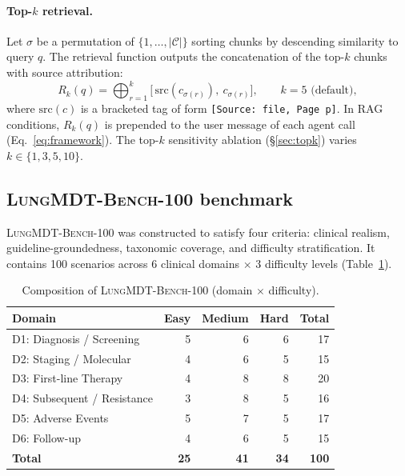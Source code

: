 \documentclass[final, 11pt, 3p]{elsarticle}
\newcommand{\BENCH}{\textsc{LungMDT-Bench-100}}
\begin{document}
\paragraph{Top-$k$ retrieval.} Let $\sigma$ be a permutation of
$\{1, \ldots, |\mathcal{C}|\}$ sorting chunks by descending similarity
to query $q$. The retrieval function outputs the concatenation of the
top-$k$ chunks with source attribution:
\begin{equation}
R_k(q) = \bigoplus_{r=1}^{k} \bigl[\,\mathrm{src}(c_{\sigma(r)}),\ c_{\sigma(r)}\bigr],
\qquad k = 5 \text{ (default)},
\label{eq:topk}
\end{equation}
where $\mathrm{src}(c)$ is a bracketed tag of form
\texttt{[Source: file, Page p]}. In RAG conditions, $R_k(q)$ is
prepended to the user message of each agent call
(Eq.~\ref{eq:framework}). The top-$k$ sensitivity ablation
(\S\ref{sec:topk}) varies $k \in \{1, 3, 5, 10\}$.

\subsection{\BENCH{} benchmark}
\label{sec:bench}
\BENCH{} was constructed to satisfy four criteria: clinical realism,
guideline-groundedness, taxonomic coverage, and difficulty
stratification. It contains 100 scenarios across 6 clinical domains
$\times$ 3 difficulty levels (Table~\ref{tab:bench}).

\begin{table}[!ht]
\caption{Composition of \BENCH{} (domain $\times$ difficulty).}
\label{tab:bench}
\centering
\small
\begin{tabular}{lrrrr}
\toprule
Domain & Easy & Medium & Hard & Total \\
\midrule
D1: Diagnosis / Screening    & 5 & 6 & 6 & 17 \\
D2: Staging / Molecular      & 4 & 6 & 5 & 15 \\
D3: First-line Therapy       & 4 & 8 & 8 & 20 \\
D4: Subsequent / Resistance  & 3 & 8 & 5 & 16 \\
D5: Adverse Events           & 5 & 7 & 5 & 17 \\
D6: Follow-up                & 4 & 6 & 5 & 15 \\
\midrule
\textbf{Total}               & \textbf{25} & \textbf{41} & \textbf{34}
  & \textbf{100} \\
\bottomrule
\end{tabular}
\end{table}
\end{document}
